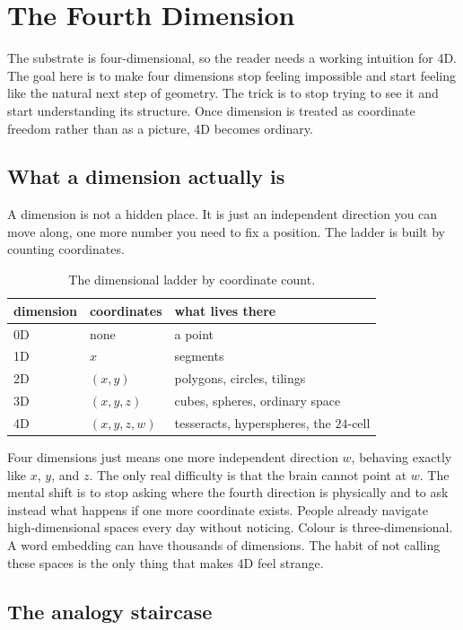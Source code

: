 \section{The Fourth Dimension}

The substrate is four-dimensional, so the reader needs a working intuition for 4D. The goal here is to make four dimensions stop feeling impossible and start feeling like the natural next step of geometry. The trick is to stop trying to see it and start understanding its structure. Once dimension is treated as coordinate freedom rather than as a picture, 4D becomes ordinary.

\subsection{What a dimension actually is}

A dimension is not a hidden place. It is just an independent direction you can move along, one more number you need to fix a position. The ladder is built by counting coordinates.

\begin{table}[ht]
\centering
\begin{tabular}{@{}lll@{}}
\toprule
dimension & coordinates & what lives there \\
\midrule
0D & none & a point \\
1D & $x$ & segments \\
2D & $(x,y)$ & polygons, circles, tilings \\
3D & $(x,y,z)$ & cubes, spheres, ordinary space \\
4D & $(x,y,z,w)$ & tesseracts, hyperspheres, the $24$-cell \\
\bottomrule
\end{tabular}
\caption{The dimensional ladder by coordinate count.}
\end{table}

Four dimensions just means one more independent direction $w$, behaving exactly like $x$, $y$, and $z$. The only real difficulty is that the brain cannot point at $w$. The mental shift is to stop asking where the fourth direction is physically and to ask instead what happens if one more coordinate exists. People already navigate high-dimensional spaces every day without noticing. Colour is three-dimensional. A word embedding can have thousands of dimensions. The habit of not calling these spaces is the only thing that makes 4D feel strange.

\subsection{The analogy staircase}


